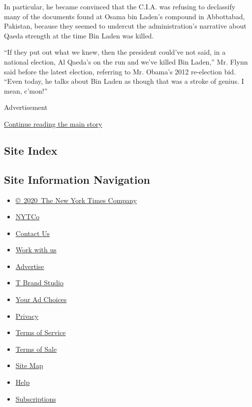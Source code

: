In particular, he became convinced that the C.I.A. was refusing to
declassify many of the documents found at Osama bin Laden's compound in
Abbottabad, Pakistan, because they seemed to undercut the
administration's narrative about Qaeda strength at the time Bin Laden
was killed.

``If they put out what we knew, then the president could've not said, in
a national election, Al Qaeda's on the run and we've killed Bin Laden,''
Mr. Flynn said before the latest election, referring to Mr. Obama's 2012
re-election bid. ``Even today, he talks about Bin Laden as though that
was a stroke of genius. I mean, c'mon!''

Advertisement

\protect\hyperlink{after-bottom}{Continue reading the main story}

\hypertarget{site-index}{%
\subsection{Site Index}\label{site-index}}

\hypertarget{site-information-navigation}{%
\subsection{Site Information
Navigation}\label{site-information-navigation}}

\begin{itemize}
\tightlist
\item
  \href{https://help.nytimes.com/hc/en-us/articles/115014792127-Copyright-notice}{©~2020~The
  New York Times Company}
\end{itemize}

\begin{itemize}
\tightlist
\item
  \href{https://www.nytco.com/}{NYTCo}
\item
  \href{https://help.nytimes.com/hc/en-us/articles/115015385887-Contact-Us}{Contact
  Us}
\item
  \href{https://www.nytco.com/careers/}{Work with us}
\item
  \href{https://nytmediakit.com/}{Advertise}
\item
  \href{http://www.tbrandstudio.com/}{T Brand Studio}
\item
  \href{https://www.nytimes.com/privacy/cookie-policy\#how-do-i-manage-trackers}{Your
  Ad Choices}
\item
  \href{https://www.nytimes.com/privacy}{Privacy}
\item
  \href{https://help.nytimes.com/hc/en-us/articles/115014893428-Terms-of-service}{Terms
  of Service}
\item
  \href{https://help.nytimes.com/hc/en-us/articles/115014893968-Terms-of-sale}{Terms
  of Sale}
\item
  \href{https://spiderbites.nytimes.com}{Site Map}
\item
  \href{https://help.nytimes.com/hc/en-us}{Help}
\item
  \href{https://www.nytimes.com/subscription?campaignId=37WXW}{Subscriptions}
\end{itemize}
